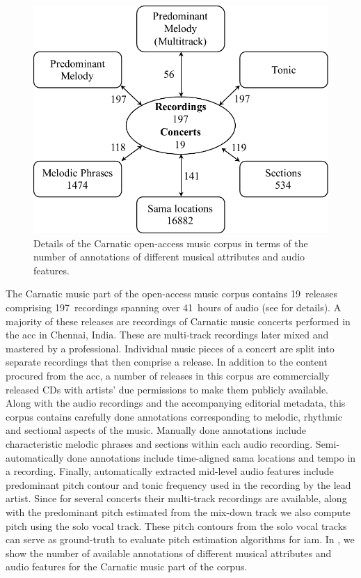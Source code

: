 \begin{figure}
	\begin{center}
		\includegraphics[width=\figSizeSeventyFive]{ch04_datasets/figures/carnatic_CC_details.pdf}
	\end{center}
	\caption[Details of the open-access Carnatic music corpus]{Details of the Carnatic open-access music corpus in terms of the number of annotations of different musical attributes and audio features.}
	\label{fig:carnatic_open_access_corpus_details_annotations}
\end{figure}


The Carnatic music part of the open-access music corpus contains 19~releases comprising 197~recordings spanning over 41~hours of audio (see  for details). A majority of these releases are recordings of Carnatic music concerts performed in the \gls{acc} in Chennai, India. These are multi-track recordings later mixed and mastered by a professional. Individual music pieces of a concert are split into separate recordings that then comprise a release. In addition to the content procured from the \gls{acc}, a number of releases in this corpus are commercially released CDs with artists' due permissions to make them publicly available. Along with the audio recordings and the accompanying editorial metadata, this corpus contains carefully done annotations corresponding to melodic, rhythmic and sectional aspects of the music. Manually done annotations include characteristic melodic phrases and sections within each audio recording. Semi-automatically done annotations include time-aligned sama locations and tempo in a recording. Finally, automatically extracted mid-level audio features include predominant pitch contour and tonic frequency used in the recording by the lead artist. Since for several concerts their multi-track recordings are available, along with the predominant pitch estimated from the mix-down track we also compute pitch using the solo vocal track. These pitch contours from the solo vocal tracks can serve as ground-truth to evaluate pitch estimation algorithms for \gls{iam}. In , we show the number of available annotations of different musical attributes and audio features for the Carnatic music part of the corpus.


